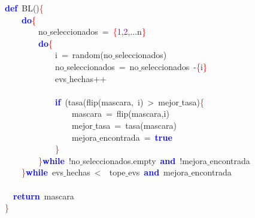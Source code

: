 \noindent
\mbox{}\textbf{\textcolor{Blue}{def}}\ BL\textcolor{BrickRed}{()}\textcolor{Red}{\{} \\
\mbox{}\ \ \ \ \textbf{\textcolor{Blue}{do}}\textcolor{Red}{\{} \\
\mbox{}\ \ \ \ \ \ \ \ no$\_$seleccionados\ \textcolor{BrickRed}{=}\ \textcolor{Red}{\{}\textcolor{Purple}{1}\textcolor{BrickRed}{,}\textcolor{Purple}{2}\textcolor{BrickRed}{,...}n\textcolor{Red}{\}} \\
\mbox{}\ \ \ \ \ \ \ \ \textbf{\textcolor{Blue}{do}}\textcolor{Red}{\{} \\
\mbox{}\ \ \ \ \ \ \ \ \ \ \ \ i\ \textcolor{BrickRed}{=}\ random\textcolor{BrickRed}{(}no$\_$seleccionados\textcolor{BrickRed}{)} \\
\mbox{}\ \ \ \ \ \ \ \ \ \ \ \ no$\_$seleccionados\ \textcolor{BrickRed}{=}\ no$\_$seleccionados\ \textcolor{BrickRed}{-}\textcolor{Red}{\{}i\textcolor{Red}{\}} \\
\mbox{}\ \ \ \ \ \ \ \ \ \ \ \ evs$\_$hechas\textcolor{BrickRed}{++} \\
\mbox{} \\
\mbox{}\ \ \ \ \ \ \ \ \ \ \ \ \textbf{\textcolor{Blue}{if}}\ \textcolor{BrickRed}{(}tasa\textcolor{BrickRed}{(}flip\textcolor{BrickRed}{(}mascara\textcolor{BrickRed}{,}\ i\textcolor{BrickRed}{)}\ \textcolor{BrickRed}{\textgreater{}}\ mejor$\_$tasa\textcolor{BrickRed}{)}\textcolor{Red}{\{} \\
\mbox{}\ \ \ \ \ \ \ \ \ \ \ \ \ \ \ \ mascara\ \textcolor{BrickRed}{=}\ flip\textcolor{BrickRed}{(}mascara\textcolor{BrickRed}{,}i\textcolor{BrickRed}{)} \\
\mbox{}\ \ \ \ \ \ \ \ \ \ \ \ \ \ \ \ mejor$\_$tasa\ \textcolor{BrickRed}{=}\ tasa\textcolor{BrickRed}{(}mascara\textcolor{BrickRed}{)} \\
\mbox{}\ \ \ \ \ \ \ \ \ \ \ \ \ \ \ \ mejora$\_$encontrada\ \textcolor{BrickRed}{=}\ \textbf{\textcolor{Blue}{true}} \\
\mbox{}\ \ \ \ \ \ \ \ \ \ \ \ \textcolor{Red}{\}} \\
\mbox{}\ \ \ \ \ \ \ \ \textcolor{Red}{\}}\textbf{\textcolor{Blue}{while}}\ \textcolor{BrickRed}{!}no$\_$seleccionados\textcolor{BrickRed}{.}empty\ \textbf{\textcolor{Blue}{and}}\ \textcolor{BrickRed}{!}mejora$\_$encontrada \\
\mbox{}\ \ \ \ \textcolor{Red}{\}}\textbf{\textcolor{Blue}{while}}\ evs$\_$hechas\ \textcolor{BrickRed}{\textless{}}\ \ tope$\_$evs\ \textbf{\textcolor{Blue}{and}}\ mejora$\_$encontrada \\
\mbox{} \\
\mbox{}\ \ \textbf{\textcolor{Blue}{return}}\ mascara \\
\mbox{}\textcolor{Red}{\}} \\
\mbox{}
